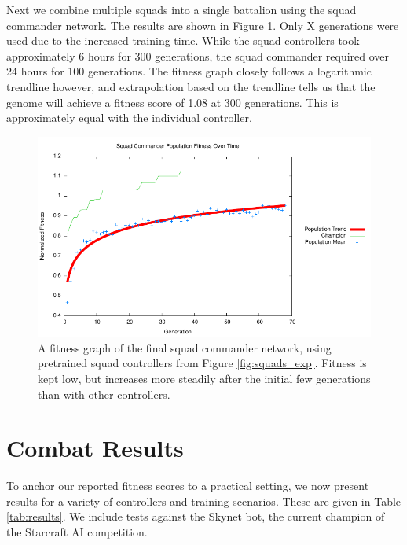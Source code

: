 \documentclass[a4paper]{article}
\newcommand{\fillin}[1]{X}
\begin{document}
Next we combine multiple squads into a single battalion using the squad commander network. The results are shown in Figure \ref{fig:squadcommand_exp}. Only \fillin{generations for squad command} generations were used due to the increased training time. While the squad controllers took approximately 6 hours for 300 generations, the squad commander required over 24 hours for 100 generations. The fitness graph closely follows a logarithmic trendline however, and extrapolation based on the trendline tells us that the genome will achieve a fitness score of 1.08 at 300 generations. This is approximately equal with the individual controller.

\begin{figure}
\centering
\includegraphics[scale=1.1]{plots/squadcommand.pdf}
\caption{A fitness graph of the final squad commander network, using pretrained squad controllers from Figure \ref{fig:squads_exp}. Fitness is kept low, but increases more steadily after the initial few generations than with other controllers.}
\label{fig:squadcommand_exp}
\end{figure}

\section{Combat Results}

To anchor our reported fitness scores to a practical setting, we now present results for a variety of controllers and training scenarios. These are given in Table \ref{tab:results}. We include tests against the Skynet bot, the current champion of the Starcraft AI competition.
\end{document}
